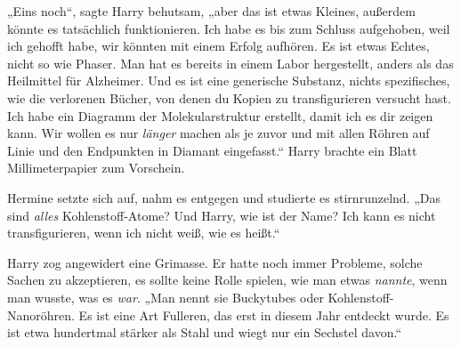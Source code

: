 „Eins noch“, sagte Harry behutsam, „aber das ist etwas Kleines, außerdem könnte es tatsächlich funktionieren. Ich habe es bis zum Schluss aufgehoben, weil ich gehofft habe, wir könnten mit einem Erfolg aufhören. Es ist etwas Echtes, nicht so wie Phaser. Man hat es bereits in einem Labor hergestellt, anders als das Heilmittel für Alzheimer. Und es ist eine generische Substanz, nichts spezifisches, wie die verlorenen Bücher, von denen du Kopien zu transfigurieren versucht hast. Ich habe ein Diagramm der Molekularstruktur erstellt, damit ich es dir zeigen kann. Wir wollen es nur \emph{länger} machen als je zuvor und mit allen Röhren auf Linie und den Endpunkten in Diamant eingefasst.“ Harry brachte ein Blatt Millimeterpapier zum Vorschein.

Hermine setzte sich auf, nahm es entgegen und studierte es stirnrunzelnd. „Das sind \emph{alles} Kohlenstoff-Atome? Und Harry, wie ist der Name? Ich kann es nicht transfigurieren, wenn ich nicht weiß, wie es heißt.“

Harry zog angewidert eine Grimasse. Er hatte noch immer Probleme, solche Sachen zu akzeptieren, es sollte keine Rolle spielen, wie man etwas \emph{nannte}, wenn man wusste, was es \emph{war}. „Man nennt sie Buckytubes oder Kohlenstoff-Nanoröhren. Es ist eine Art Fulleren, das erst in diesem Jahr entdeckt wurde. Es ist etwa hundertmal stärker als Stahl und wiegt nur ein Sechstel davon.“

